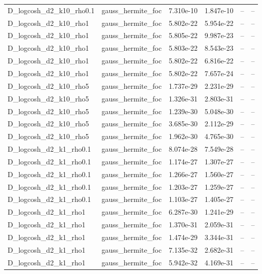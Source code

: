 \begin{tabular}{llllll}
D\_logcosh\_d2\_k10\_rho0.1 & gauss\_hermite\_foc & 7.310e-10 & 1.847e-10 & -- & -- \\
D\_logcosh\_d2\_k10\_rho1 & gauss\_hermite\_foc & 5.802e-22 & 5.954e-22 & -- & -- \\
D\_logcosh\_d2\_k10\_rho1 & gauss\_hermite\_foc & 5.805e-22 & 9.987e-23 & -- & -- \\
D\_logcosh\_d2\_k10\_rho1 & gauss\_hermite\_foc & 5.803e-22 & 8.543e-23 & -- & -- \\
D\_logcosh\_d2\_k10\_rho1 & gauss\_hermite\_foc & 5.802e-22 & 6.816e-22 & -- & -- \\
D\_logcosh\_d2\_k10\_rho1 & gauss\_hermite\_foc & 5.802e-22 & 7.657e-24 & -- & -- \\
D\_logcosh\_d2\_k10\_rho5 & gauss\_hermite\_foc & 1.737e-29 & 2.231e-29 & -- & -- \\
D\_logcosh\_d2\_k10\_rho5 & gauss\_hermite\_foc & 1.326e-31 & 2.803e-31 & -- & -- \\
D\_logcosh\_d2\_k10\_rho5 & gauss\_hermite\_foc & 1.239e-30 & 5.048e-30 & -- & -- \\
D\_logcosh\_d2\_k10\_rho5 & gauss\_hermite\_foc & 3.685e-30 & 2.112e-29 & -- & -- \\
D\_logcosh\_d2\_k10\_rho5 & gauss\_hermite\_foc & 1.962e-30 & 4.765e-30 & -- & -- \\
D\_logcosh\_d2\_k1\_rho0.1 & gauss\_hermite\_foc & 8.074e-28 & 7.549e-28 & -- & -- \\
D\_logcosh\_d2\_k1\_rho0.1 & gauss\_hermite\_foc & 1.174e-27 & 1.307e-27 & -- & -- \\
D\_logcosh\_d2\_k1\_rho0.1 & gauss\_hermite\_foc & 1.266e-27 & 1.560e-27 & -- & -- \\
D\_logcosh\_d2\_k1\_rho0.1 & gauss\_hermite\_foc & 1.203e-27 & 1.259e-27 & -- & -- \\
D\_logcosh\_d2\_k1\_rho0.1 & gauss\_hermite\_foc & 1.103e-27 & 1.405e-27 & -- & -- \\
D\_logcosh\_d2\_k1\_rho1 & gauss\_hermite\_foc & 6.287e-30 & 1.241e-29 & -- & -- \\
D\_logcosh\_d2\_k1\_rho1 & gauss\_hermite\_foc & 1.370e-31 & 2.059e-31 & -- & -- \\
D\_logcosh\_d2\_k1\_rho1 & gauss\_hermite\_foc & 1.474e-29 & 3.344e-31 & -- & -- \\
D\_logcosh\_d2\_k1\_rho1 & gauss\_hermite\_foc & 7.135e-32 & 2.682e-31 & -- & -- \\
D\_logcosh\_d2\_k1\_rho1 & gauss\_hermite\_foc & 5.942e-32 & 4.169e-31 & -- & -- \\

\end{tabular}
